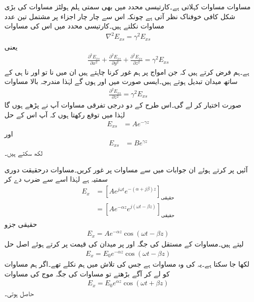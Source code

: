  مساوات    مساوات کہلاتی ہے۔کارتیسی محدد میں بھی سمتی ہلم ہولٹز مساوات کی بڑی شکل  کافی خوفناک نظر آتی ہے چونکہ اس سے چار چار اجزاء پر مشتمل تین عدد مساوات نکلتے ہیں۔کارتیسی محدد میں اس  کی  مساوات 
\begin{align}
\nabla^2 E_{xs}=\gamma^2 E_{xs} 
\end{align}
یعنی
\begin{align}
\frac{\partial^2  E_{xs}}{\partial x^2}+\frac{\partial^2  E_{xs}}{\partial y^2}+\frac{\partial^2  E_{xs}}{\partial z^2} =\gamma^2  E_{xs} 
\end{align}
ہے۔ہم فرض کرتے ہیں کہ جن امواج پر ہم غور کرنا چاہتے ہیں ان میں نا تو  اور نا ہی  کے ساتھ میدان تبدیل ہوتے ہیں۔ایسی صورت
 میں  اور  ہوں گے لہٰذا  مندرجہ بالا مساوات
\begin{align}
\frac{\partial^2  E_{xs}}{\partial z^2} =\gamma^2 E_{xs} 
\end{align}
صورت اختیار کر لے گی۔اس طرح کے دو درجی تفرقی مساوات آپ نے پڑھے ہوں گا لہٰذا میں توقع رکھتا ہوں کہ آپ اس کے حل
\begin{align}\label{مساوات_موج_مثبت_زیڈ_جانب}
E_{xs}&=A e^{-\gamma z}
\end{align}
اور
\begin{align}\label{مساوات_موج_منفی_زیڈ_جانب}
E_{xs}&=Be^{\gamma z}
\end{align}
لکھ سکتے ہیں۔

آئیں  پر کرتے ہوئے ان جوابات میں سے مساوات  پر غور کریں۔مساوات  درحقیقت دوری سمتیہ ہے لہٰذا اسے   سے ضرب دے کر
\begin{align*}
E_x&=\left[A e^{j \omega t} e^{-(\alpha+j \beta) z} \right]_{\textrm{حقیقی}}\\
&=\left[A e^{-\alpha z} e^{j(\omega t -\beta z)} \right]_{\textrm{حقیقی}}
\end{align*}
حقیقی  جزو
\begin{align*}
E_x=A e^{-\alpha z} \cos (\omega t -\beta z)
\end{align*}
لیتے ہیں۔مساوات کے مستقل  کی جگہ  اور  پر میدان کی قیمت  پر کرتے ہوئے اصل حل
\begin{align}\label{مساوات_موج_کوسائن_مثبت_موج}
E_x=E_0 e^{-\alpha z} \cos (\omega t -\beta z)
\end{align}
لکھا جا سکتا ہے۔یہ  کی وہ مساوات  ہے جس کی تلاش میں ہم نکلے تھے۔اگر ہم مساوات  کو لے کر آگے بڑھتے تو مساوات  کی جگہ موج کی مساوات
\begin{align}\label{مساوات_موج_کوسائن_منفی_موج}
E_x=E_0 e^{\alpha z} \cos (\omega t +\beta z)
\end{align}
حاصل ہوتی۔

